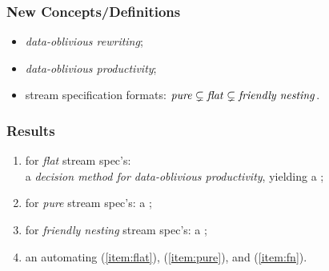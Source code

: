 \documentclass[10pt]{beamer}
\begin{document}
\begin{frame}%
  \frametitle{New Concepts/Definitions}


\begin{itemize}
  \item \emph{data-oblivious rewriting};
    \vspace*{0.15ex}
  \item \emph{data-oblivious productivity};
    \vspace*{0.15ex}
  \item stream specification formats: 
    $ \text{\emph{pure}}
        \subsetneq
      \text{\emph{flat}}
        \subsetneq 
      \text{\emph{friendly nesting}} $.
\end{itemize}


\begin{center}
\end{center}

\end{frame}%

\begin{frame}%
  \frametitle{Results}

\begin{enumerate}
  \item \label{item:flat}
    for \emph{flat} stream spec's:\\ a 
    \emph{decision method for data-oblivious productivity},
    yielding a
    ;
    \vspace*{0.15ex}
  \item \label{item:pure}
    for \emph{pure} stream spec's: 
    a ; 
    \vspace*{0.15ex}
  \item \label{item:fn}
    for \emph{friendly nesting} stream spec's: 
    a ; 
    \vspace*{0.15ex}
  \item an  automating (\ref{item:flat}),
    (\ref{item:pure}), and (\ref{item:fn}). 
\end{enumerate}

\vspace*{-0.75ex}
%
\begin{center}
\end{center}

\end{frame}%
\end{document}
